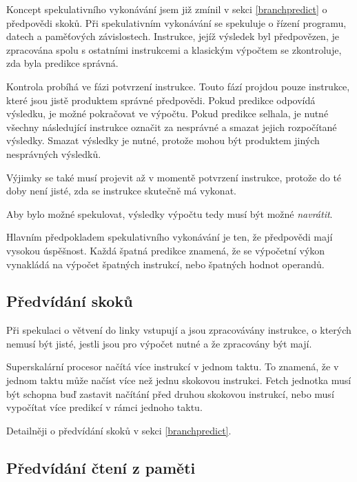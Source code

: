 
Koncept spekulativního vykonávání jsem již zmínil v sekci \ref{branchpredict} o předpovědi skoků.
Při spekulativním vykonávání se spekuluje o řízení programu, datech a paměťových závislostech.
Instrukce, jejíž výsledek byl předpovězen, je zpracována spolu s ostatními instrukcemi a klasickým výpočtem se zkontroluje, zda byla predikce správná.

Kontrola probíhá ve fázi potvrzení instrukce.
Touto fází projdou pouze instrukce, které jsou jistě produktem správné předpovědi.
Pokud predikce odpovídá výsledku, je možné pokračovat ve výpočtu.
Pokud predikce selhala, je nutné všechny následující instrukce označit za nesprávné a smazat jejich rozpočítané výsledky.
Smazat výsledky je nutné, protože mohou být produktem jiných nesprávných výsledků.

Výjimky se také musí projevit až v momentě potvrzení instrukce, protože do té doby není jisté, zda se instrukce skutečně má vykonat. 

Aby bylo možné spekulovat, výsledky výpočtu tedy musí být možné \emph{navrátit}.

Hlavním předpokladem spekulativního vykonávání je ten, že předpovědi mají vysokou úspěšnost.
Každá špatná predikce znamená, že se výpočetní výkon vynakládá na výpočet špatných instrukcí, nebo špatných hodnot operandů.

\subsection{Předvídání skoků}

Při spekulaci o větvení do linky vstupují a jsou zpracovávány instrukce, o kterých nemusí být jisté, jestli jsou pro výpočet nutné a že zpracovány být mají.

Superskalární procesor načítá více instrukcí v jednom taktu.
To znamená, že v jednom taktu může načíst více než jednu skokovou instrukci.
Fetch jednotka musí být schopna buď zastavit načítání před druhou skokovou instrukcí, nebo musí vypočítat více predikcí v rámci jednoho taktu.

Detailněji o předvídání skoků v sekci \ref{branchpredict}.

\subsection{Předvídání čtení z paměti}

